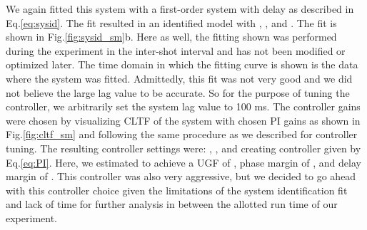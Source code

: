 We again fitted this system with a first-order system with delay as described in Eq.\ref{eq:sysid}.
The fit resulted in an identified model with \SMK, \SMTau, and \SML.
The fit is shown in Fig.\ref{fig:sysid_sm}b.
Here as well, the fitting shown was performed during the experiment in the inter-shot interval and has not been modified or optimized later.
The time domain in which the fitting curve is shown is the data where the system was fitted.
Admittedly, this fit was not very good and we did not believe the large lag value to be accurate.
So for the purpose of tuning the controller, we arbitrarily set the system lag value to 100 ms.
The controller gains were chosen by visualizing \ac{CLTF} of the system with chosen PI gains as shown in Fig.\ref{fig:cltf_sm} and following the same procedure as we described for \Afrac controller tuning.
The resulting controller settings were: \SMKp, \SMTi, and \SMstau{} creating controller given by Eq.\ref{eq:PI}.
Here, we estimated to achieve a \ac{UGF} of \SMUGF, phase margin of \SMPhaseMargin, and delay margin of \SMDelayMargin.
This controller was also very aggressive, but we decided to go ahead with this controller choice given the limitations of the system identification fit and lack of time for further analysis in between the allotted run time of our experiment.
